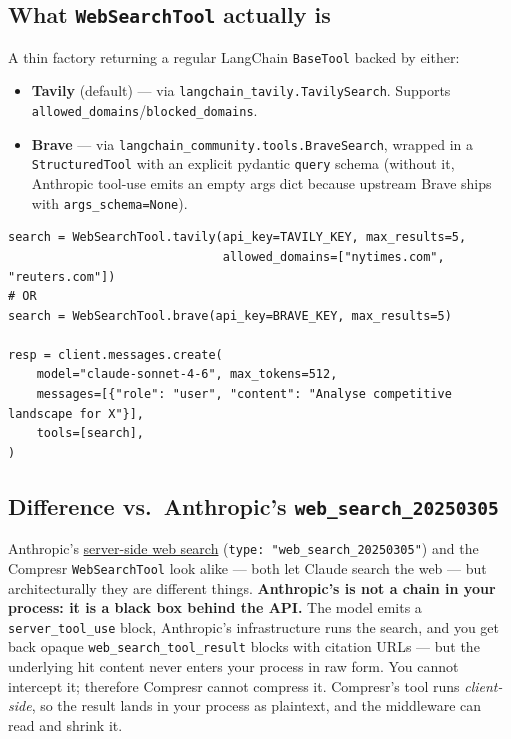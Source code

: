 \documentclass[10pt,a4paper]{article}
\begin{document}
\subsection{What \texttt{WebSearchTool} actually is}

A thin factory returning a regular LangChain \texttt{BaseTool} backed by either:
\begin{itemize}
  \item \textbf{Tavily} (default) --- via \texttt{langchain\_tavily.TavilySearch}. Supports \texttt{allowed\_domains}/\texttt{blocked\_domains}.
  \item \textbf{Brave} --- via \texttt{langchain\_community.tools.BraveSearch}, wrapped in a \texttt{StructuredTool} with an explicit pydantic \texttt{query} schema (without it, Anthropic tool-use emits an empty args dict because upstream Brave ships with \texttt{args\_schema=None}).
\end{itemize}

\begin{lstlisting}
search = WebSearchTool.tavily(api_key=TAVILY_KEY, max_results=5,
                              allowed_domains=["nytimes.com", "reuters.com"])
# OR
search = WebSearchTool.brave(api_key=BRAVE_KEY, max_results=5)

resp = client.messages.create(
    model="claude-sonnet-4-6", max_tokens=512,
    messages=[{"role": "user", "content": "Analyse competitive landscape for X"}],
    tools=[search],
)
\end{lstlisting}

\subsection{Difference vs.\ Anthropic's \texttt{web\_search\_20250305}}

Anthropic's \href{https://platform.claude.com/docs/en/agents-and-tools/tool-use/web-search-tool}{server-side web search} (\texttt{type: "web\_search\_20250305"}) and the Compresr \texttt{WebSearchTool} look alike --- both let Claude search the web --- but architecturally they are different things. \textbf{Anthropic's is not a chain in your process: it is a black box behind the API.} The model emits a \texttt{server\_tool\_use} block, Anthropic's infrastructure runs the search, and you get back opaque \texttt{web\_search\_tool\_result} blocks with citation URLs --- but the underlying hit content never enters your process in raw form. You cannot intercept it; therefore Compresr cannot compress it. Compresr's tool runs \emph{client-side}, so the result lands in your process as plaintext, and the middleware can read and shrink it.
\end{document}
